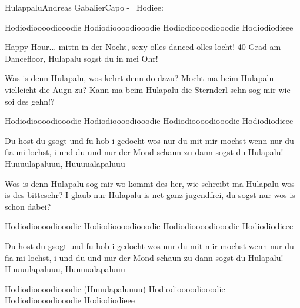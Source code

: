 \begin{song}{Hulappalu}{Andreas Gabalier}{Capo - \textperiodcentered\ Hodiee:}

Hodiodioooodiooodie 
Hodiodioooodiooodie 
Hodiodioooodiooodie
Hodiodiodieee 

Happy Hour... mittn in der Nocht, 
sexy olles danced olles locht!
40 Grad am Dancefloor,
Hulapalu sogst du in mei Ohr!

Was is denn Hulapalu, wos kehrt denn do dazu?
Mocht ma beim Hulapalu vielleicht die Augn zu?
Kann ma beim Hulapalu die Sternderl sehn
sog mir wie soi des gehn!?

Hodiodioooodiooodie 
Hodiodioooodiooodie 
Hodiodioooodiooodie
Hodiodiodieee 

Du host du gsogt und fu hob i gedocht wos nur
du mit mir mochst wenn nur du fia mi lochst, 
i und du und nur der Mond schaun zu
dann sogst du Hulapalu! 
Huuuulapaluuu,  Huuuualapaluuu

Wos is denn Hulapalu sog mir wo kommt des her, 
wie schreibt ma Hulapalu wos is des bittesehr? 
I glaub nur Hulapalu is net ganz jugendfrei, 
du sogst nur wos is schon dabei?

Hodiodioooodiooodie 
Hodiodioooodiooodie 
Hodiodioooodiooodie
Hodiodiodieee 

Du host du gsogt und fu hob i gedocht wos nur
du mit mir mochst wenn nur du fia mi lochst, 
i und du und nur der Mond schaun zu
dann sogst du Hulapalu! 
Huuuulapaluuu,  Huuuualapaluuu

Hodiodioooodiooodie (Huuulapaluuuu)               
Hodiodioooodiooodie 
Hodiodioooodiooodie 
Hodiodiodieee
\end{song}
